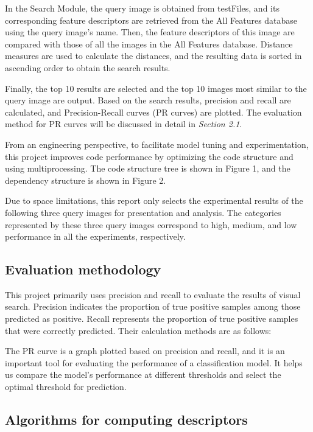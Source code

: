 \documentclass{article}
\begin{document}
In the Search Module, the query image is obtained from testFiles, and its corresponding feature descriptors are retrieved from the All Features database using the query image’s name. Then, the feature descriptors of this image are compared with those of all the images in the All Features database. Distance measures are used to calculate the distances, and the resulting data is sorted in ascending order to obtain the search results.

Finally, the top 10 results are selected and the top 10 images most similar to the query image are output. Based on the search results, precision and recall are calculated, and Precision-Recall curves (PR curves) are plotted. The evaluation method for PR curves will be discussed in detail in \textit{Section 2.1}.

From an engineering perspective, to facilitate model tuning and experimentation, this project improves code performance by optimizing the code structure and using multiprocessing. The code structure tree is shown in Figure 1, and the dependency structure is shown in Figure 2.

Due to space limitations, this report only selects the experimental results of the following three query images for presentation and analysis. The categories represented by these three query images correspond to high, medium, and low performance in all the experiments, respectively.

\subsection{Evaluation methodology}

This project primarily uses precision and recall to evaluate the results of visual search. Precision indicates the proportion of true positive samples among those predicted as positive. Recall represents the proportion of true positive samples that were correctly predicted. Their calculation methods are as follows:



The PR curve is a graph plotted based on precision and recall, and it is an important tool for evaluating the performance of a classification model. It helps us compare the model’s performance at different thresholds and select the optimal threshold for prediction.

\subsection{Algorithms for computing descriptors}
\end{document}
